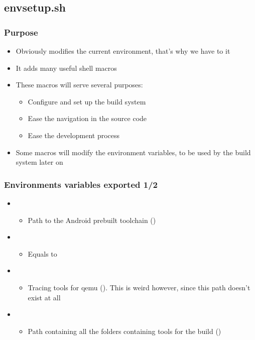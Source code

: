 \subsection{envsetup.sh}

\begin{frame}
  \frametitle{Purpose}
  \begin{itemize}
  \item Obviously modifies the current environment, that's why we have
    to  it
  \item It adds many useful shell macros
  \item These macros will serve several purposes:
    \begin{itemize}
    \item Configure and set up the build system
    \item Ease the navigation in the source code
    \item Ease the development process
    \end{itemize}
  \item Some macros will modify the environment variables, to be used
    by the build system later on
  \end{itemize}
\end{frame}

\begin{frame}
  \frametitle{Environments variables exported 1/2}
  \begin{itemize}
  \item {}
    \begin{itemize}
    \item Path to the Android prebuilt toolchain
      ()
    \end{itemize}
  \item {}
    \begin{itemize}
    \item Equals to 
    \end{itemize}
  \item {}
    \begin{itemize}
    \item Tracing tools for qemu
      (). This is weird however,
      since this path doesn't exist at all
    \end{itemize}
  \item {}
    \begin{itemize}
    \item Path containing all the folders containing tools for the
      build
      ()
    \end{itemize}
  \end{itemize}
\end{frame}

